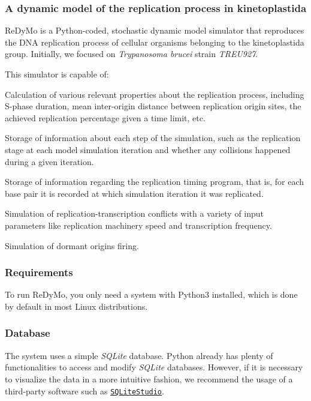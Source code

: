 \subsubsection*{A dynamic model of the replication process in kinetoplastida}

Re\+Dy\+Mo is a Python-\/coded, stochastic dynamic model simulator that reproduces the D\+NA replication process of cellular organisms belonging to the kinetoplastida group. Initially, we focused on {\itshape Trypanosoma brucei} strain {\itshape T\+R\+E\+U927}.

This simulator is capable of\+:
\begin{DoxyItemize}
\item Calculation of various relevant properties about the replication process, including S-\/phase duration, mean inter-\/origin distance between replication origin sites, the achieved replication percentage given a time limit, etc.
\item Storage of information about each step of the simulation, such as the replication stage at each model simulation iteration and whether any collisions happened during a given iteration.
\item Storage of information regarding the replication timing program, that is, for each base pair it is recorded at which simulation iteration it was replicated.
\item Simulation of replication-\/transcription conflicts with a variety of input parameters like replication machinery speed and transcription frequency.
\item Simulation of dormant origins firing.
\end{DoxyItemize}

\subsubsection*{Requirements}

To run Re\+Dy\+Mo, you only need a system with Python3 installed, which is done by default in most Linux distributions.

\subsubsection*{Database}

The system uses a simple {\itshape S\+Q\+Lite} database. Python already has plenty of functionalities to access and modify {\itshape S\+Q\+Lite} databases. However, if it is necessary to visualize the data in a more intuitive fashion, we recommend the usage of a third-\/party software such as \href{https://sqlitestudio.pl/index.rvt>}{\tt S\+Q\+Lite\+Studio}.

